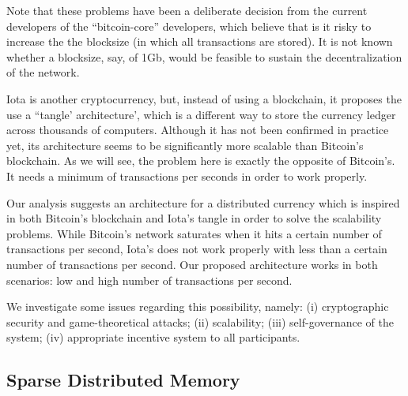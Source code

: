 \documentclass[12pt]{article}
\begin{document}
Note that these problems have been a deliberate decision from the current developers of the ``bitcoin-core'' developers, which believe that is it risky to increase the the blocksize (in which all transactions are stored).  It is not known whether a blocksize, say, of 1Gb, would be feasible to sustain the decentralization of the network. 

Iota is another cryptocurrency, but, instead of using a blockchain, it proposes the use a ``tangle' architecture', which is a different way to store the currency ledger across thousands of computers. Although it has not been confirmed in practice yet, its architecture seems to be significantly more scalable than Bitcoin's blockchain. As we will see, the problem here is exactly the opposite of Bitcoin's. It needs a minimum of transactions per seconds in order to work properly.

Our analysis suggests an architecture for a distributed currency which is inspired in both Bitcoin's blockchain and Iota's tangle in order to solve the scalability problems. While Bitcoin's network saturates when it hits a certain number of transactions per second, Iota's does not work properly with less than a certain number of transactions per second. Our proposed architecture works in both scenarios: low and high number of transactions per second.

We investigate some issues regarding this possibility, namely: (i) cryptographic security and game-theoretical attacks; (ii) scalability; (iii) self-governance of the system; (iv) appropriate incentive system to all participants.


\subsection{Sparse Distributed Memory}
\end{document}
